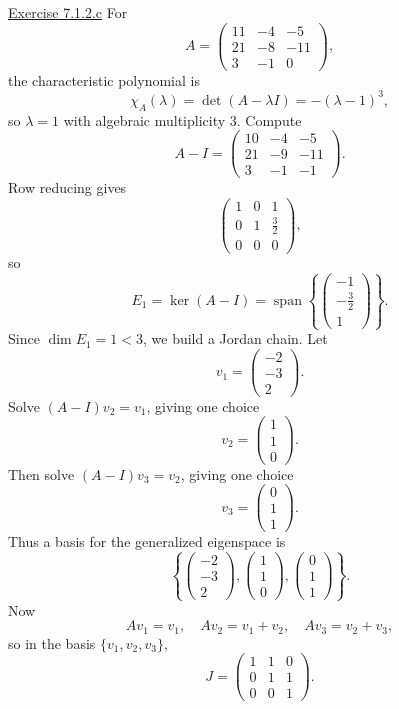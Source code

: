 \documentclass{exam}
\begin{document}
\underline{Exercise 7.1.2.c}
\newline
\newline
For
\[
A=\begin{pmatrix}
11 & -4 & -5\\
21 & -8 & -11\\
3 & -1 & 0
\end{pmatrix},
\]
the characteristic polynomial is
\[
\chi_A(\lambda)=\det(A-\lambda I)=-(\lambda-1)^3,
\]
so $\lambda=1$ with algebraic multiplicity $3$. Compute
\[
A-I=\begin{pmatrix}
10 & -4 & -5\\
21 & -9 & -11\\
3 & -1 & -1
\end{pmatrix}.
\]
Row reducing gives
\[
\begin{pmatrix}
1 & 0 & 1\\
0 & 1 & \tfrac{3}{2}\\
0 & 0 & 0
\end{pmatrix},
\]
so
\[
E_1=\ker(A-I)=\operatorname{span}\left\{
\begin{pmatrix}-1\\-\tfrac{3}{2}\\1\end{pmatrix}
\right\}.
\]
Since $\dim E_1=1<3$, we build a Jordan chain. Let
\[
v_1=\begin{pmatrix}-2\\-3\\2\end{pmatrix}.
\]
Solve $(A-I)v_2=v_1$, giving one choice
\[
v_2=\begin{pmatrix}1\\1\\0\end{pmatrix}.
\]
Then solve $(A-I)v_3=v_2$, giving one choice
\[
v_3=\begin{pmatrix}0\\1\\1\end{pmatrix}.
\]
Thus a basis for the generalized eigenspace is
\[
\left\{
\begin{pmatrix}-2\\-3\\2\end{pmatrix},
\begin{pmatrix}1\\1\\0\end{pmatrix},
\begin{pmatrix}0\\1\\1\end{pmatrix}
\right\}.
\]
Now
\[
Av_1=v_1,\quad Av_2=v_1+v_2,\quad Av_3=v_2+v_3,
\]
so in the basis $\{v_1,v_2,v_3\}$,
\[
J=
\begin{pmatrix}
1 & 1 & 0\\
0 & 1 & 1\\
0 & 0 & 1
\end{pmatrix}.
\]
\end{document}
